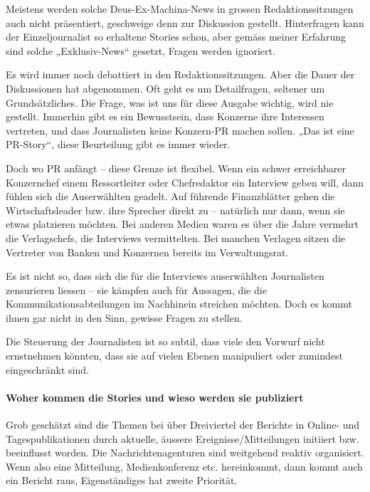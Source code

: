 Meistens werden solche Deus-Ex-Machina-News in grossen
Redaktionssitzungen auch nicht präsentiert, geschweige denn zur
Diskussion gestellt. Hinterfragen kann der Einzeljournalist so erhaltene
Stories schon, aber gemäss meiner Erfahrung sind solche „Exklusiv-News``
gesetzt, Fragen werden ignoriert.

Es wird immer noch debattiert in den Redaktionssitzungen. Aber die Dauer
der Diskussionen hat abgenommen. Oft geht es um Detailfragen, seltener
um Grundsätzliches. Die Frage, was ist uns für diese Ausgabe wichtig,
wird nie gestellt. Immerhin gibt es ein Bewusstsein, dass Konzerne ihre
Interessen vertreten, und dass Journalisten keine Konzern-PR machen
sollen. „Das ist eine PR-Story``, diese Beurteilung gibt es immer
wieder.

Doch wo PR anfängt -- diese Grenze ist flexibel. Wenn ein schwer
erreichbarer Konzernchef einem Ressortleiter oder Chefredaktor ein
Interview geben will, dann fühlen sich die Auserwählten geadelt. Auf
führende Finanzblätter gehen die Wirtschaftsleader bzw. ihre Sprecher
direkt zu -- natürlich nur dann, wenn sie etwas platzieren möchten. Bei
anderen Medien waren es über die Jahre vermehrt die Verlagschefs, die
Interviews vermittelten. Bei manchen Verlagen sitzen die Vertreter von
Banken und Konzernen bereits im Verwaltungsrat.

Es ist nicht so, dass sich die für die Interviews auserwählten
Journalisten zensurieren liessen -- sie kämpfen auch für Aussagen, die
die Kommunikationsabteilungen im Nachhinein streichen möchten. Doch es
kommt ihnen gar nicht in den Sinn, gewisse Fragen zu stellen.

Die Steuerung der Journalisten ist so subtil, dass viele den Vorwurf
nicht ernstnehmen könnten, dass sie auf vielen Ebenen manipuliert oder
zumindest eingeschränkt sind.

\hypertarget{woher-kommen-die-stories-und-wieso-werden-sie-publiziert}{%
\paragraph{Woher kommen die Stories und wieso werden sie
publiziert}\label{woher-kommen-die-stories-und-wieso-werden-sie-publiziert}}

Grob geschätzt sind die Themen bei über Dreiviertel der Berichte in
Online- und Tagespublikationen durch aktuelle, äussere
Ereignisse/Mitteilungen initiiert bzw. beeinflusst worden. Die
Nachrichten­agenturen sind weitgehend reaktiv organisiert. Wenn also
eine Mitteilung, Medien­konferenz etc. hereinkommt, dann kommt auch ein
Bericht raus, Eigenständiges hat zweite Priorität.

